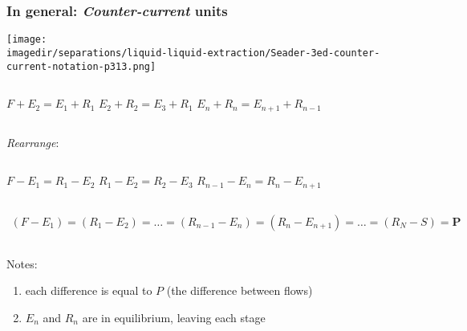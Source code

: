 \begin{frame}\frametitle{In general: \emph{Counter-current} units}
	\begin{center}
		\texttt{[image: \\imagedir/separations/liquid-liquid-extraction/Seader-3ed-counter-current-notation-p313.png]}
	\end{center}
		\begin{center}
			\begin{columns}[t]
					\small $F + E_2 = E_1 + R_1$
					\small $E_2 + R_2 = E_3 + R_1$
					\small $E_n + R_n = E_{n+1} + R_{n-1}$
			\end{columns}
		\end{center}
		\vspace{-12pt}
		\emph{Rearrange}:
		\begin{center}		
			\begin{columns}[t]
					\small $F - E_1 = R_1 - E_2$
					\small $R_1 - E_2 = R_2 - E_3$
					\small $R_{n-1} - E_n = R_{n} - E_{n+1}$
			\end{columns}
		\end{center}
		\vspace{-12pt}
		\begin{columns}[t]
				{			
				\small
				\[	
				\begin{array}{c}
					(F - E_1)  =  (R_1 - E_2) = \ldots = (R_{n-1} - E_n) = (R_{n} - E_{n+1}) = \ldots = (R_N - S) = \mathbf{P}
				\end{array}		
				\]}
		\end{columns}
		Notes:
		\begin{enumerate}
			\item	each difference is equal to $P$ (the difference between flows)
			\item	$E_n$ and $R_{n}$ are in equilibrium, leaving each stage {\color{myOrange}{[via tie line]}}
		\end{enumerate} 
\end{frame}

